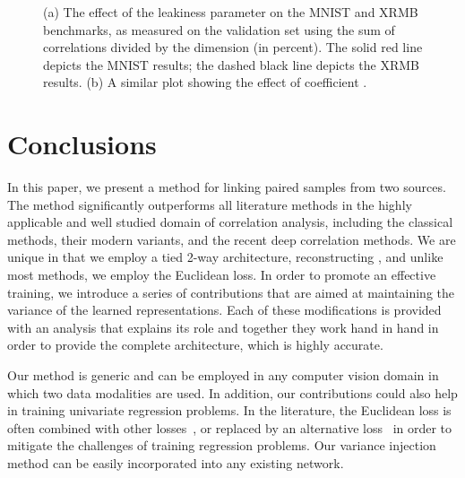 \documentclass[10pt,twocolumn,letterpaper]{article}
\begin{document}
\begin{figure*}[t]
{\begin{subfigure}{\columnwidth}
\caption{}
\end{subfigure}}

    \caption{(a) The effect of the leakiness parameter on the MNIST and XRMB benchmarks, as measured on the validation set using the sum of correlations divided by the dimension (in percent). The solid red line depicts the MNIST results; the dashed black line depicts the XRMB results. (b) A similar plot showing the effect of coefficient .}
    \label{fig:leak}\end{figure*}

\section{Conclusions}

In this paper, we present a method for linking paired samples from two sources. The method significantly outperforms all literature methods in the highly applicable and well studied domain of correlation analysis, including the classical methods, their modern variants, and the recent deep correlation methods. We are unique in that we employ a tied 2-way architecture, reconstructing , and unlike most methods, we employ the Euclidean loss. In order to promote an effective training, we introduce a series of contributions that are aimed at maintaining the variance of the learned representations. Each of these modifications is  provided with an analysis that explains its role and together they work hand in hand in order to provide the complete architecture, which is highly accurate. 

Our method is generic and can be employed in any computer vision domain in which two data modalities are used. In addition, our contributions could also help in training univariate regression problems. In the literature, the Euclidean loss is often combined with other losses~\cite{NIPS2015_5638,Zhang_2015_CVPR}, or replaced by an alternative loss~\cite{Levy_2015_ICCV} in order to mitigate the challenges of training regression problems. Our variance injection method can be easily incorporated into any existing network.
\end{document}

